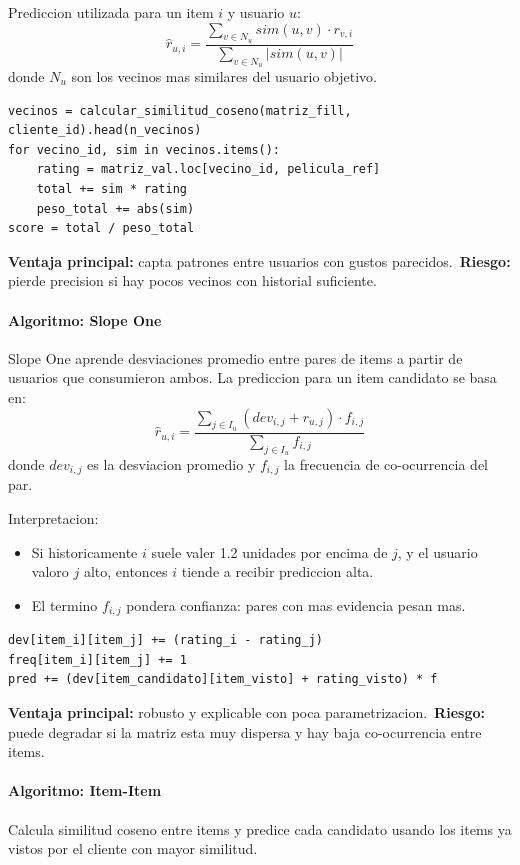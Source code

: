 ﻿\documentclass{article}
\begin{document}
Prediccion utilizada para un item \(i\) y usuario \(u\):
\[
\hat{r}_{u,i}=\frac{\sum_{v\in N_u} sim(u,v)\cdot r_{v,i}}{\sum_{v\in N_u}|sim(u,v)|}
\]
donde \(N_u\) son los vecinos mas similares del usuario objetivo.

\begin{lstlisting}
vecinos = calcular_similitud_coseno(matriz_fill, cliente_id).head(n_vecinos)
for vecino_id, sim in vecinos.items():
    rating = matriz_val.loc[vecino_id, pelicula_ref]
    total += sim * rating
    peso_total += abs(sim)
score = total / peso_total
\end{lstlisting}

\textbf{Ventaja principal:} capta patrones entre usuarios con gustos parecidos.\
\textbf{Riesgo:} pierde precision si hay pocos vecinos con historial suficiente.

\paragraph{Algoritmo: Slope One}
Slope One aprende desviaciones promedio entre pares de items a partir de usuarios que consumieron ambos. La prediccion para un item candidato se basa en:
\[
\hat{r}_{u,i}=\frac{\sum_{j\in I_u}(dev_{i,j}+r_{u,j})\cdot f_{i,j}}{\sum_{j\in I_u}f_{i,j}}
\]
donde \(dev_{i,j}\) es la desviacion promedio y \(f_{i,j}\) la frecuencia de co-ocurrencia del par.

Interpretacion:
\begin{itemize}
    \item Si historicamente \(i\) suele valer 1.2 unidades por encima de \(j\), y el usuario valoro \(j\) alto, entonces \(i\) tiende a recibir prediccion alta.
    \item El termino \(f_{i,j}\) pondera confianza: pares con mas evidencia pesan mas.
\end{itemize}

\begin{lstlisting}
dev[item_i][item_j] += (rating_i - rating_j)
freq[item_i][item_j] += 1
pred += (dev[item_candidato][item_visto] + rating_visto) * f
\end{lstlisting}

\textbf{Ventaja principal:} robusto y explicable con poca parametrizacion.\
\textbf{Riesgo:} puede degradar si la matriz esta muy dispersa y hay baja co-ocurrencia entre items.

\paragraph{Algoritmo: Item-Item}
Calcula similitud coseno entre items y predice cada candidato usando los items ya vistos por el cliente con mayor similitud.
\end{document}
